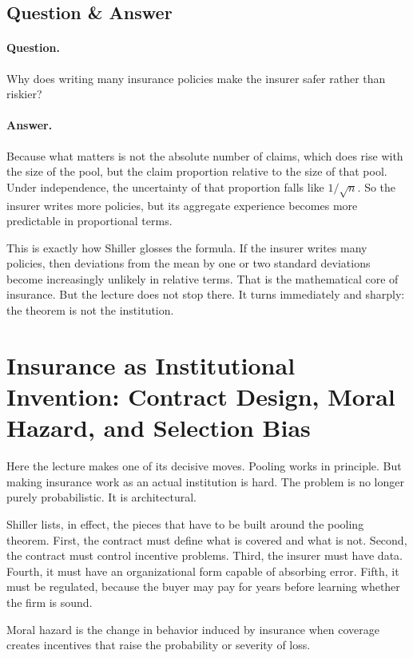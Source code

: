 \subsection{Question \& Answer}

\paragraph{Question.} Why does writing many insurance policies make the insurer safer rather than riskier?

\paragraph{Answer.} Because what matters is not the absolute number of claims, which does rise with the size of the pool, but the claim proportion relative to the size of that pool. Under independence, the uncertainty of that proportion falls like \(1/\sqrt{n}\). So the insurer writes more policies, but its aggregate experience becomes more predictable in proportional terms.

This is exactly how Shiller glosses the formula. If the insurer writes many policies, then deviations from the mean by one or two standard deviations become increasingly unlikely in relative terms. That is the mathematical core of insurance. But the lecture does not stop there. It turns immediately and sharply: the theorem is not the institution.

\section{Insurance as Institutional Invention: Contract Design, Moral Hazard, and Selection Bias}

Here the lecture makes one of its decisive moves. Pooling works in principle. But making insurance work as an actual institution is hard. The problem is no longer purely probabilistic. It is architectural.

Shiller lists, in effect, the pieces that have to be built around the pooling theorem. First, the contract must define what is covered and what is not. Second, the contract must control incentive problems. Third, the insurer must have data. Fourth, it must have an organizational form capable of absorbing error. Fifth, it must be regulated, because the buyer may pay for years before learning whether the firm is sound.

\begin{definition}
Moral hazard is the change in behavior induced by insurance when coverage creates incentives that raise the probability or severity of loss.
\end{definition}

